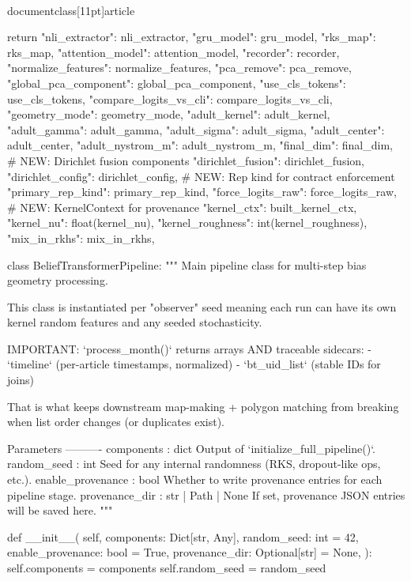 \\documentclass[11pt]{article}
\begin{document}
\begin{CodeBlock}
    return {
        "nli_extractor": nli_extractor,
        "gru_model": gru_model,
        "rks_map": rks_map,
        "attention_model": attention_model,
        "recorder": recorder,
        "normalize_features": normalize_features,
        "pca_remove": pca_remove,
        "global_pca_component": global_pca_component,
        "use_cls_tokens": use_cls_tokens,
        "compare_logits_vs_cli": compare_logits_vs_cli,
        "geometry_mode": geometry_mode,
        "adult_kernel": adult_kernel,
        "adult_gamma": adult_gamma,
        "adult_sigma": adult_sigma,
        "adult_center": adult_center,
        "adult_nystrom_m": adult_nystrom_m,
        "final_dim": final_dim,
        # NEW: Dirichlet fusion components
        "dirichlet_fusion": dirichlet_fusion,
        "dirichlet_config": dirichlet_config,
        # NEW: Rep kind for contract enforcement
        "primary_rep_kind": primary_rep_kind,
        "force_logits_raw": force_logits_raw,
        # NEW: KernelContext for provenance
        "kernel_ctx": built_kernel_ctx,
        "kernel_nu": float(kernel_nu),
        "kernel_roughness": int(kernel_roughness),
        "mix_in_rkhs": mix_in_rkhs,
    }


class BeliefTransformerPipeline:
    """
    Main pipeline class for multi-step bias geometry processing.

    This class is instantiated per "observer" seed  meaning each run can have its own
    kernel random features and any seeded stochasticity.

    IMPORTANT: `process_month()` returns arrays AND traceable sidecars:
      - `timeline` (per-article timestamps, normalized)
      - `bt_uid_list` (stable IDs for joins)

    That is what keeps downstream map-making + polygon matching from breaking when list
    order changes (or duplicates exist).

    Parameters
    ----------
    components : dict
        Output of `initialize_full_pipeline()`.
    random_seed : int
        Seed for any internal randomness (RKS, dropout-like ops, etc.).
    enable_provenance : bool
        Whether to write provenance entries for each pipeline stage.
    provenance_dir : str | Path | None
        If set, provenance JSON entries will be saved here.
    """

    def __init__(
        self,
        components: Dict[str, Any],
        random_seed: int = 42,
        enable_provenance: bool = True,
        provenance_dir: Optional[str] = None,
    ):
        self.components = components
        self.random_seed = random_seed


\end{CodeBlock}
\end{document}
